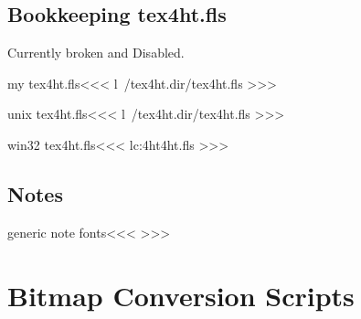 \documentclass{article}
\begin{document}
\subsection{Bookkeeping tex4ht.fls}

Currently broken and Disabled.


\<my tex4ht.fls\><<<
l~/tex4ht.dir/tex4ht.fls
>>>




\<unix tex4ht.fls\><<<
 l~/tex4ht.dir/tex4ht.fls
>>>



\<win32 tex4ht.fls\><<<
lc:\tex4ht\tex4ht.fls
>>>


\subsection{Notes}

\<generic note fonts\><<<
>>>



\section{Bitmap Conversion Scripts}
\end{document}
